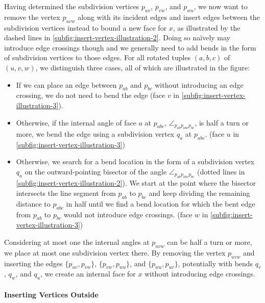 Having determined the subdivision vertices $p_{uv}$, $p_{vw}$, and $p_{wu}$, we now want to remove the vertex $p_{uvw}$ along with its incident edges and insert edges between the subdivision vertices instead to bound a new face for $x$, as illustrated by the dashed lines in \cref{subfig:insert-vertex-illustration-2}. Doing so naïvely may introduce edge crossings though and we generally need to add bends in the form of subdivision vertices to those edges. For all rotated tuples $(a,b,c)$ of $(u,v,w)$, we distinguish three cases, all of which are illustrated in the figure:
%
%
\begin{itemize}
	\item If we can place an edge between $p_{ab}$ and $p_{bc}$ without introducing an edge crossing, we do not need to bend the edge (face $v$ in \cref{subfig:insert-vertex-illustration-3}).
	\item Otherwise, if the internal angle of face $a$ at $p_{abc}$, $\angle_{p_{ab}p_{abc}p_{bc}}$, is half a turn or more, we bend the edge using a subdivision vertex $q_a$ at $p_{abc}$. (face $u$ in \cref{subfig:insert-vertex-illustration-3})
	\item Otherwise, we search for a bend location in the form of a subdivision vertex $q_a$ on the outward-pointing bisector of the angle $\angle_{p_{ab}p_{abc}p_{bc}}$ (dotted lines in \cref{subfig:insert-vertex-illustration-2}). We start at the point where the bisector intersects the line segment from $p_{ab}$ to $p_{bc}$ and keep dividing the remaining distance to $p_{abc}$ in half until we find a bend location for which the bent edge from $p_{ab}$ to $p_{bc}$ would not introduce edge crossings. (face $w$ in \cref{subfig:insert-vertex-illustration-3})
\end{itemize}

Considering at most one the internal angles at $p_{uvw}$ can be half a turn or more, we place at most one subdivision vertex there. By removing the vertex $p_{uvw}$ and inserting the edges $\{p_{uv},p_{vw}\}$, $\{p_{vw},p_{wu}\}$, and $\{p_{wu},p_{uv}\}$, potentially with bends $q_v$, $q_w$, and $q_u$, we create an internal face for $x$ without introducing edge crossings.



\paragraph{Inserting Vertices Outside}

